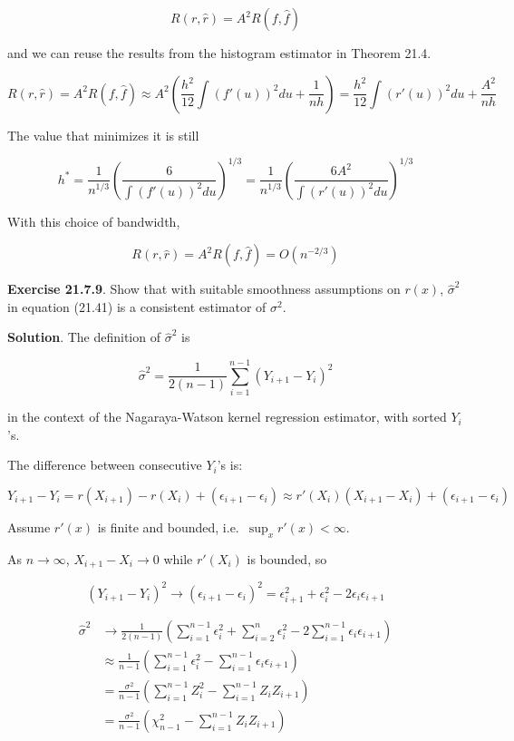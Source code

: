 \[ R(r, \hat{r}) = A^2 R(f, \hat{f}) \]

and we can reuse the results from the histogram estimator in Theorem
21.4.

\[ R(r, \hat{r}) = A^2 R(f, \hat{f}) \approx A^2 \left( \frac{h^2}{12} \int (f'(u))^2 du + \frac{1}{nh} \right) = \frac{h^2}{12} \int (r'(u))^2 du + \frac{A^2}{nh} \]

The value that minimizes it is still

\[ h^* = \frac{1}{n^{1/3}} \left( \frac{6}{\int (f'(u))^2 du} \right)^{1/3} = \frac{1}{n^{1/3}} \left( \frac{6A^2}{\int (r'(u))^2 du} \right)^{1/3}\]

With this choice of bandwidth,

\[ R(r, \hat{r}) = A^2 R(f, \hat{f}) = O(n^{-2/3}) \]

\textbf{Exercise 21.7.9}. Show that with suitable smoothness assumptions
on \(r(x)\), \(\hat{\sigma}^2\) in equation (21.41) is a consistent
estimator of \(\sigma^2\).

\textbf{Solution}. The definition of \(\hat{\sigma}^2\) is

\[ \hat{\sigma}^2 = \frac{1}{2(n - 1)} \sum_{i=1}^{n-1} (Y_{i+1} - Y_i)^2\]

in the context of the Nagaraya-Watson kernel regression estimator, with
sorted \(Y_i\)'s.

The difference between consecutive \(Y_i\)'s is:

\[ Y_{i+1} - Y_i = r(X_{i+1}) - r(X_i) + (\epsilon_{i+1} - \epsilon_i) \approx r'(X_i) (X_{i+1} - X_i) + (\epsilon_{i+1} - \epsilon_i) \]

Assume \(r'(x)\) is finite and bounded, i.e.~\(\sup_x r'(x) < \infty\).

As \(n \rightarrow \infty\), \(X_{i+1} - X_i \rightarrow 0\) while
\(r'(X_i)\) is bounded, so

\[ (Y_{i+1} - Y_i)^2 \rightarrow (\epsilon_{i+1} - \epsilon_i)^2 = \epsilon_{i+1}^2 + \epsilon_i^2 - 2\epsilon_i \epsilon_{i+1} \]

\[ 
\begin{align}
\hat{\sigma}^2 &\rightarrow \frac{1}{2(n - 1)} \left(\sum_{i = 1}^{n - 1} \epsilon_i^2 + \sum_{i = 2}^n \epsilon_i^2 -2 \sum_{i = 1}^{n - 1} \epsilon_i \epsilon_{i+1} \right) \\
&\approx \frac{1}{n - 1} \left( \sum_{i = 1}^{n - 1} \epsilon_i^2 - \sum_{i = 1}^{n - 1} \epsilon_i \epsilon_{i+1} \right) \\
&= \frac{\sigma^2}{n - 1} \left( \sum_{i = 1}^{n - 1} Z_i^2 - \sum_{i = 1}^{n - 1} Z_i Z_{i+1} \right) \\
&= \frac{\sigma^2}{n - 1} \left( \chi_{n - 1}^2 - \sum_{i = 1}^{n - 1} Z_i Z_{i+1} \right)
\end{align}
\]

